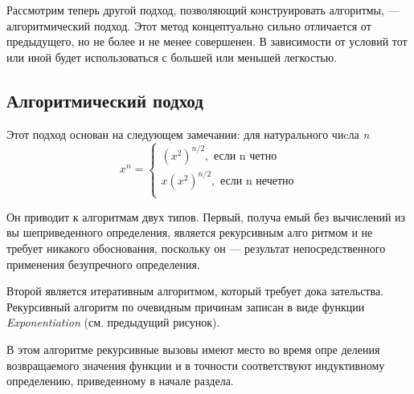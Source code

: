 \parindent=1cm Рассмотрим теперь другой подход, позволяющий конструировать
алгоритмы, — алгоритмический подход. Этот метод концептуально
сильно отличается от предыдущего, но не более и не менее совершенен.
В зависимости от условий тот или иной будет использоваться с большей
или меньшей легкостью.
\subsection{ Алгоритмический подход}
\noindent Этот подход основан на следующем замечании: для натурального чиcла \textit{n}
\begin{equation*}
 x^n = 
 \begin{cases}
   (x^{2})^{n/2}, \text{ если n четно}
   \\
   x(x^{2})^{n/2}, \text{ если n нечетно}
   \\
 \end{cases}
\end{equation*}

\pagebreak
{}
\noindent Он приводит к алгоритмам
двух типов. Первый, получа­
емый без вычислений из вы­
шеприведенного определения,
является рекурсивным алго­
ритмом и не требует никакого
обоснования, поскольку он —
результат непосредственного
применения безупречного определения.

\parindent=1cm Второй является итеративным алгоритмом, который требует дока­
зательства. Рекурсивный алгоритм по очевидным причинам записан в
виде функции \textit{Exponentiation} (см. предыдущий рисунок).

\parindent=1cm В этом алгоритме рекурсивные вызовы имеют место во время опре­
деления возвращаемого значения функции и в точности соответствуют
индуктивному определению, приведенному в начале раздела.

